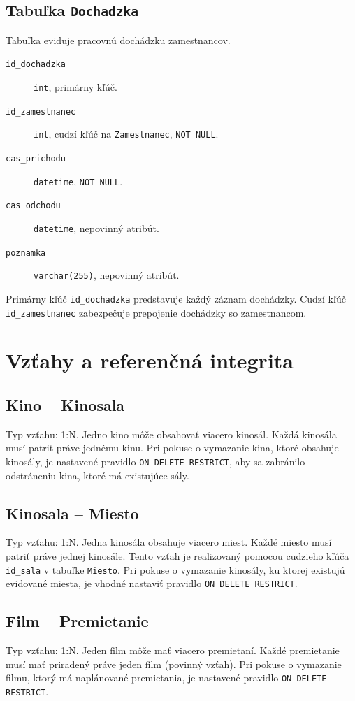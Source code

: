 \documentclass[11pt, a4paper]{article}
\begin{document}
\subsection{Tabuľka \texttt{Dochadzka}}
Tabuľka eviduje pracovnú dochádzku zamestnancov.
\begin{description}
    \item[\texttt{id\_dochadzka}] \texttt{int}, primárny kľúč.
    \item[\texttt{id\_zamestnanec}] \texttt{int}, cudzí kľúč na \texttt{Zamestnanec}, \texttt{NOT NULL}.    
    \item[\texttt{cas\_prichodu}] \texttt{datetime}, \texttt{NOT NULL}.
    \item[\texttt{cas\_odchodu}] \texttt{datetime}, nepovinný atribút.
    \item[\texttt{poznamka}] \texttt{varchar(255)}, nepovinný atribút.
\end{description}
Primárny kľúč \texttt{id\_dochadzka} predstavuje každý záznam dochádzky.
Cudzí kľúč \texttt{id\_zamestnanec} zabezpečuje prepojenie dochádzky so zamestnancom.

\section{Vzťahy a referenčná integrita}
\label{sec:vztahy}

\subsection{Kino -- Kinosala}
Typ vzťahu: 1:N. Jedno kino môže obsahovať viacero kinosál. Každá kinosála musí patriť
práve jednému kinu. Pri pokuse o vymazanie kina, ktoré obsahuje kinosály, je nastavené
pravidlo \texttt{ON DELETE RESTRICT}, aby sa zabránilo odstráneniu kina, ktoré má existujúce
sály.

\subsection{Kinosala -- Miesto}
Typ vzťahu: 1:N. Jedna kinosála obsahuje viacero miest. Každé miesto musí patriť
práve jednej kinosále. Tento vzťah je realizovaný pomocou cudzieho kľúča
\texttt{id\_sala} v tabuľke \texttt{Miesto}. Pri pokuse o vymazanie kinosály,
ku ktorej existujú evidované miesta, je vhodné nastaviť pravidlo
\texttt{ON DELETE RESTRICT}.

\subsection{Film -- Premietanie}
Typ vzťahu: 1:N. Jeden film môže mať viacero premietaní. Každé premietanie musí mať
priradený práve jeden film (povinný vzťah). Pri pokuse o vymazanie filmu, ktorý má
naplánované premietania, je nastavené pravidlo \texttt{ON DELETE RESTRICT}.
\end{document}
